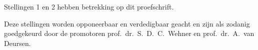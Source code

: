 \noindent
{\small
Stellingen 1 en 2 hebben betrekking op dit proefschrift.
}

\bigskip \noindent
{\small
Deze stellingen worden opponeerbaar en verdedigbaar geacht en zijn als zodanig goedgekeurd door de
promotoren prof.\ dr.\ S.\ D.\ C.\ Wehner en prof.\ dr.\ A.\ van Deursen.
}
